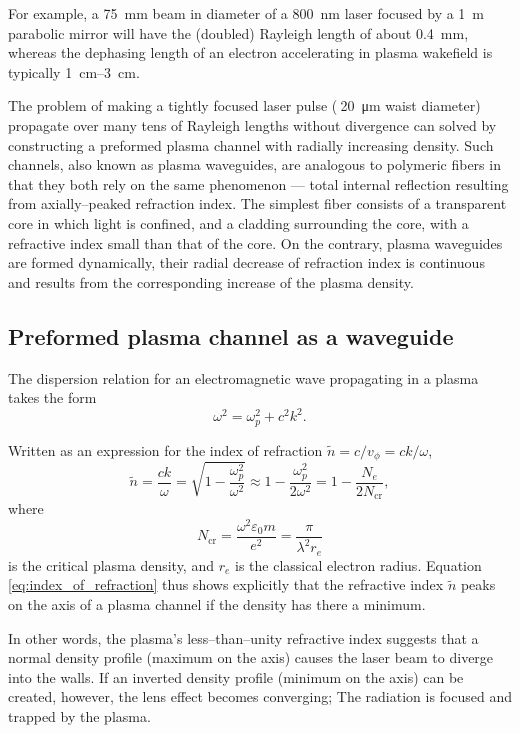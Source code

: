\documentclass[justified,nofonts,nobib,openany]{tufte-book}
\begin{document}
For example, a \SI{75}{\mm} beam in diameter of a \SI{800}{\nm} laser focused by a \SI{1}{\m} parabolic mirror will have the (doubled) Rayleigh length of about \SI{0.4}{\mm}, whereas the dephasing length of an electron accelerating in plasma wakefield is typically \SIrange{1}{3}{\cm}.

The problem of making a tightly focused laser pulse ($~$\SI{20}{\um} waist diameter) propagate over many tens of Rayleigh lengths without divergence can solved by constructing a preformed plasma channel with radially increasing density. Such channels, also known as plasma waveguides, are analogous to polymeric fibers in that they both rely on the same phenomenon --- total internal reflection resulting from axially--peaked refraction index. The simplest fiber consists of a transparent core in which light is confined, and a cladding surrounding the core, with a refractive index small than that of the core. On the contrary, plasma waveguides are formed dynamically, their radial decrease of refraction index is continuous and results from the corresponding increase of the plasma density.
\subsection*{Preformed plasma channel as a waveguide}
The dispersion relation \cite{Chen1984IntroductionFusion} for an electromagnetic wave propagating in a plasma takes the form 
\begin{equation}
\omega^2=\omega_p^2+c^2 k^2.
\end{equation}

Written as an expression for the index of refraction $\tilde{n}=c/v_\phi = ck/\omega$,
\begin{equation}
\tilde{n}=\frac{c k}{\omega}=\sqrt{1-\frac{\omega_p^2}{\omega^2}}\approx1-\frac{\omega_p^2}{2\omega^2}=1-\frac{N_e}{2N_\text{cr}}, \label{eq:index_of_refraction}
\end{equation}
where
\begin{equation}
    N_\text{cr}=\frac{\omega^2\varepsilon_0 m}{e^2}=\frac{\pi}{\lambda^2 r_e}
\end{equation}
is the critical plasma density, and $r_e$ is the classical electron radius. Equation \ref{eq:index_of_refraction} thus shows explicitly that the refractive index $\tilde{n}$ peaks on the axis of a plasma channel if the density has there a minimum.

In other words, the plasma's less--than--unity refractive index suggests that a normal density profile (maximum on the axis) causes the laser beam to diverge into the walls. If an inverted density profile (minimum on the axis) can be created, however, the lens effect becomes converging; The radiation is focused and trapped by the plasma.
\end{document}
